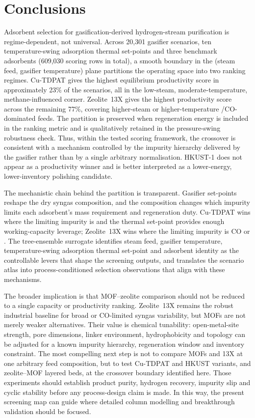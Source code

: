 \documentclass[11pt,a4paper]{article}
\newcommand{\COtwo}{\ce{CO2}}
\newcommand{\CHfour}{\ce{CH4}}
\newcommand{\TSA}{temperature-swing adsorption}
\begin{document}
\section{Conclusions}
\label{sec:conclusions}

Adsorbent selection for gasification-derived hydrogen-stream purification is
regime-dependent, not universal. Across 20{,}301 gasifier scenarios, ten
\TSA{} thermal set-points and three benchmark adsorbents (609{,}030 scoring
rows in total), a smooth boundary in the (steam feed, gasifier temperature)
plane partitions the operating space into two ranking regimes. Cu-TDPAT gives
the highest equilibrium productivity score in approximately 23\% of the
scenarios, all in the low-steam, moderate-temperature, methane-influenced
corner. Zeolite~13X gives the highest productivity score across the remaining
77\%, covering higher-steam or higher-temperature \COtwo/CO-dominated feeds.
The partition is preserved when regeneration energy is included in the ranking
metric and is qualitatively retained in the pressure-swing robustness check.
Thus, within the tested scoring framework, the crossover is consistent with a
mechanism controlled by the impurity hierarchy delivered by the gasifier rather
than by a single arbitrary normalisation. HKUST-1 does not appear as a
productivity winner and is better interpreted as a lower-energy,
lower-inventory polishing candidate.

The mechanistic chain behind the partition is transparent. Gasifier set-points
reshape the dry syngas composition, and the composition changes which
impurity limits each adsorbent's mass requirement and regeneration duty.
Cu-TDPAT wins where the limiting impurity is \CHfour{} and the thermal
set-point provides enough working-capacity leverage; Zeolite~13X wins where
the limiting impurity is CO or \COtwo{}. The tree-ensemble surrogate
identifies steam feed, gasifier temperature, \TSA{} thermal set-point and
adsorbent identity as the controllable levers that shape the screening
outputs, and translates the scenario atlas into process-conditioned
selection observations that align with these mechanisms.

The broader implication is that MOF--zeolite comparison should not be reduced
to a single capacity or productivity ranking. Zeolite~13X remains the robust
industrial baseline for broad or CO-limited syngas variability, but MOFs are
not merely weaker alternatives. Their value is chemical tunability:
open-metal-site strength, pore dimensions, linker environment, hydrophobicity
and topology can be adjusted for a known impurity hierarchy, regeneration
window and inventory constraint. The most compelling next step is not to
compare MOFs and 13X at one arbitrary feed composition, but to test Cu-TDPAT
and HKUST variants, and zeolite--MOF layered beds, at the crossover boundary
identified here. Those experiments should establish product purity, hydrogen
recovery, impurity slip and cyclic stability before any process-design claim is
made. In this way, the present screening map can guide where detailed column
modelling and breakthrough validation should be focused.
\end{document}
